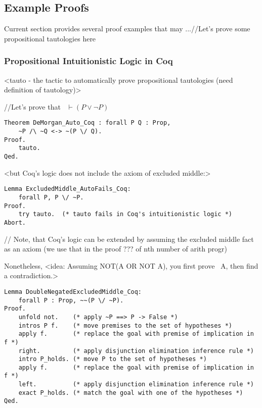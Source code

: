 \documentclass[article]{aaltoseries}
\begin{document}


\subsection{Example Proofs}

Current section provides several proof examples that may ...//Let's prove some propositional tautologies here

\subsubsection{Propositional Intuitionistic Logic in Coq}

<tauto - the tactic to automatically prove propositional tautologies (need definition of tautology)>

//Let's prove that ~$\vdash (P \lor \neg P) $

\begin{lstlisting}[language=coq]
Theorem DeMorgan_Auto_Coq : forall P Q : Prop, 
    ~P /\ ~Q <-> ~(P \/ Q).
Proof.
    tauto.
Qed.
\end{lstlisting}


<but Coq's logic does not include the axiom of excluded middle:>
\begin{lstlisting}[language=coq]
Lemma ExcludedMiddle_AutoFails_Coq:
    forall P, P \/ ~P.
Proof.
    try tauto.  (* tauto fails in Coq's intuitionistic logic *)
Abort.
\end{lstlisting}

// Note, that Coq's logic can be extended by assuming the excluded middle fact as an axiom (we use that in the proof ??? of nth number of arith progr)

Nonetheless, <idea: Assuming NOT(A OR NOT A), you first prove ~A, then find a contradiction.>

\begin{lstlisting}[language=coq]
Lemma DoubleNegatedExcludedMiddle_Coq:
    forall P : Prop, ~~(P \/ ~P).
Proof.
    unfold not.    (* apply ~P ==> P -> False *)
    intros P f.    (* move premises to the set of hypotheses *)
    apply f.       (* replace the goal with premise of implication in f *)
    right.         (* apply disjunction elimination inference rule *)
    intro P_holds. (* move P to the set of hypotheses *)
    apply f.       (* replace the goal with premise of implication in f *)
    left.          (* apply disjunction elimination inference rule *)
    exact P_holds. (* match the goal with one of the hypotheses *)
Qed.
\end{lstlisting}
\end{document}
